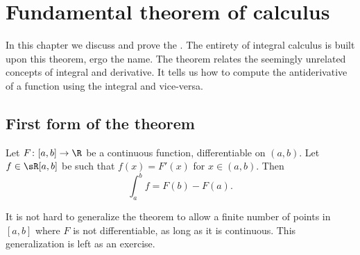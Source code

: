 \documentclass[12pt]{book}
\begin{document}

\sectionnewpage
\section{Fundamental theorem of calculus}
\label{sec:ftc}


In this chapter we discuss and prove the
\emph{}.
The entirety of integral calculus is built upon this theorem,
ergo the name.
The theorem relates the seemingly unrelated concepts of integral and
derivative.
It tells us how to compute the antiderivative of a function
using the integral and vice-versa.

\subsection*{First form of the theorem}

\begin{thm}
Let $F \colon [a,b] \to \R$ be a continuous function, differentiable
on $(a,b)$.
Let $f \in \sR[a,b]$ be such that $f(x) = F'(x)$ for $x \in
(a,b)$.
Then
\begin{equation*}
\int_a^b f = F(b)-F(a) .
\end{equation*}
\end{thm}

It is not hard to generalize the theorem to allow a finite number of points
in $[a,b]$ where $F$ is not differentiable, as long as it is continuous.
This generalization is left as an exercise.
\end{document}
